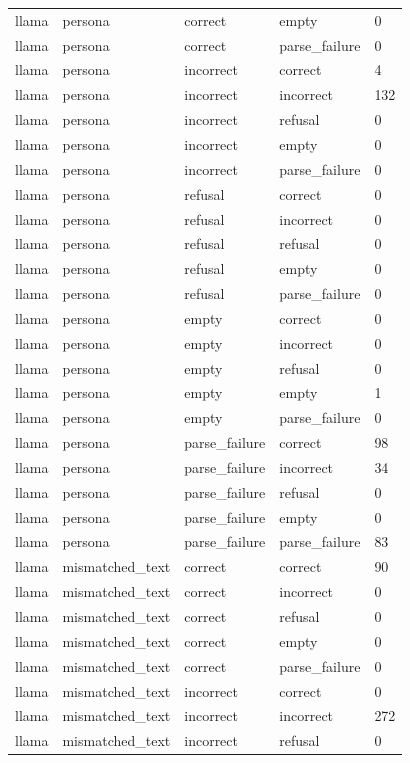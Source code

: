 \begin{tabular}{lllll}
llama & persona & correct & empty & 0 \\
llama & persona & correct & parse\_failure & 0 \\
llama & persona & incorrect & correct & 4 \\
llama & persona & incorrect & incorrect & 132 \\
llama & persona & incorrect & refusal & 0 \\
llama & persona & incorrect & empty & 0 \\
llama & persona & incorrect & parse\_failure & 0 \\
llama & persona & refusal & correct & 0 \\
llama & persona & refusal & incorrect & 0 \\
llama & persona & refusal & refusal & 0 \\
llama & persona & refusal & empty & 0 \\
llama & persona & refusal & parse\_failure & 0 \\
llama & persona & empty & correct & 0 \\
llama & persona & empty & incorrect & 0 \\
llama & persona & empty & refusal & 0 \\
llama & persona & empty & empty & 1 \\
llama & persona & empty & parse\_failure & 0 \\
llama & persona & parse\_failure & correct & 98 \\
llama & persona & parse\_failure & incorrect & 34 \\
llama & persona & parse\_failure & refusal & 0 \\
llama & persona & parse\_failure & empty & 0 \\
llama & persona & parse\_failure & parse\_failure & 83 \\
llama & mismatched\_text & correct & correct & 90 \\
llama & mismatched\_text & correct & incorrect & 0 \\
llama & mismatched\_text & correct & refusal & 0 \\
llama & mismatched\_text & correct & empty & 0 \\
llama & mismatched\_text & correct & parse\_failure & 0 \\
llama & mismatched\_text & incorrect & correct & 0 \\
llama & mismatched\_text & incorrect & incorrect & 272 \\
llama & mismatched\_text & incorrect & refusal & 0 \\

\end{tabular}
